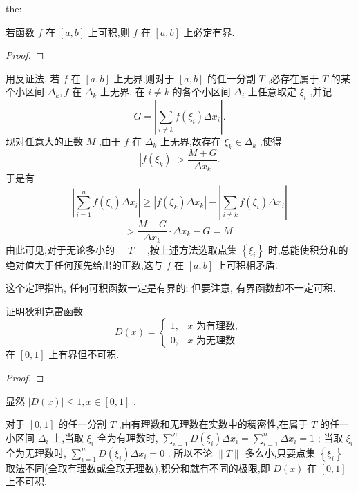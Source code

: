 \begin{theorem}{}{the:}

\end{theorem}
 若函数 \(f\) 在 \(\left\lbrack  {a,b}\right\rbrack\) 上可积,则 \(f\) 在 \(\left\lbrack  {a,b}\right\rbrack\) 上必定有界.

\begin{proof}

\end{proof}
用反证法. 若 \(f\) 在 \(\left\lbrack  {a,b}\right\rbrack\) 上无界,则对于 \(\left\lbrack  {a,b}\right\rbrack\) 的任一分割 \(T\) ,必存在属于 \(T\) 的某个小区间 \({\Delta }_{k},f\) 在 \({\Delta }_{k}\) 上无界. 在 \(i \neq  k\) 的各个小区间 \({\Delta }_{i}\) 上任意取定 \({\xi }_{i}\) ,并记
\[
G = \left| {\mathop{\sum }\limits_{{i \neq  k}}f\left( {\xi }_{i}\right) \Delta {x}_{i}}\right| .
\]
现对任意大的正数 \(M\) ,由于 \(f\) 在 \({\Delta }_{k}\) 上无界,故存在 \({\xi }_{k} \in  {\Delta }_{k}\) ,使得
\[
\left| {f\left( {\xi }_{k}\right) }\right|  > \frac{M + G}{\Delta {x}_{k}}.
\]
于是有
\[
\left| {\mathop{\sum }\limits_{{i = 1}}^{n}f\left( {\xi }_{i}\right) \Delta {x}_{i}}\right|  \geq  \left| {f\left( {\xi }_{k}\right) \Delta {x}_{k}}\right|  - \left| {\mathop{\sum }\limits_{{i \neq  k}}f\left( {\xi }_{i}\right) \Delta {x}_{i}}\right|
\]
\[
> \frac{M + G}{\Delta {x}_{k}} \cdot  \Delta {x}_{k} - G = M.
\]
由此可见,对于无论多小的 \(\parallel T\parallel\) ,按上述方法选取点集 \(\left\{  {\xi }_{i}\right\}\) 时,总能使积分和的绝对值大于任何预先给出的正数,这与 \(f\) 在 \(\left\lbrack  {a,b}\right\rbrack\) 上可积相矛盾.

这个定理指出, 任何可积函数一定是有界的; 但要注意, 有界函数却不一定可积.

\begin{example}

\end{example}
证明狄利克雷函数
\[
D\left( x\right)  = \left\{  \begin{array}{ll} 1, & x\text{ 为有理数, } \\  0, & x\text{ 为无理数 } \end{array}\right.
\]
在 \(\left\lbrack  {0,1}\right\rbrack\) 上有界但不可积.

\begin{proof}

\end{proof}
显然 \(\left| {D\left( x\right) }\right|  \leq  1,x \in  \left\lbrack  {0,1}\right\rbrack\) .

对于 \(\left\lbrack  {0,1}\right\rbrack\) 的任一分割 \(T\) ,由有理数和无理数在实数中的稠密性,在属于 \(T\) 的任一小区间 \({\Delta }_{i}\) 上,当取 \({\xi }_{i}\) 全为有理数时, \(\mathop{\sum }\limits_{{i = 1}}^{n}D\left( {\xi }_{i}\right) \Delta {x}_{i} = \mathop{\sum }\limits_{{i = 1}}^{n}\Delta {x}_{i} = 1\) ; 当取 \({\xi }_{i}\) 全为无理数时, \(\mathop{\sum }\limits_{{i = 1}}^{n}D\left( {\xi }_{i}\right) \Delta {x}_{i} = 0\) . 所以不论 \(\parallel T\parallel\) 多么小,只要点集 \(\left\{  {\xi }_{i}\right\}\) 取法不同(全取有理数或全取无理数),积分和就有不同的极限,即 \(D\left( x\right)\) 在 \(\left\lbrack  {0,1}\right\rbrack\) 上不可积.


